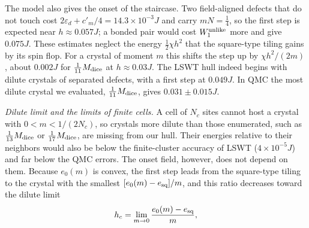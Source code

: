 \documentclass[prb,twocolumn,amsmath,amssymb,floatfix]{revtex4-2}
\newcommand{\Md}{M_{\rm dice}}
\newcommand{\eps}{\varepsilon}
\begin{document}
The model also gives the onset of the staircase. Two field-aligned defects that do not touch cost $2\eps_d+c'_m/4=14.3\times10^{-3}J$ and carry $mN=\frac14$, so the first step is expected near $h\approx0.057J$; a bonded pair would cost $W_1^{\rm unlike}$ more and give $0.075J$. These estimates neglect the energy $\frac12\chi h^2$ that the square-type tiling gains by its spin flop. For a crystal of moment $m$ this shifts the step up by $\chi h^2/(2m)$, about $0.002J$ for $\frac1{11}\Md$ at $h\approx0.03J$. The LSWT hull indeed begins with dilute crystals of separated defects, with a first step at $0.049J$. In QMC the most dilute crystal we evaluated, $\frac1{11}\Md$, gives $0.031\pm0.015J$.

\emph{Dilute limit and the limits of finite cells.} A cell of $N_c$ sites cannot host a crystal with $0<m<1/(2N_c)$, so crystals more dilute than those enumerated, such as $\frac1{13}\Md$ or $\frac1{17}\Md$, are missing from our hull. Their energies relative to their neighbors would also be below the finite-cluster accuracy of LSWT ($4\times10^{-5}J$) and far below the QMC errors. The onset field, however, does not depend on them. Because $e_0(m)$ is convex, the first step leads from the square-type tiling to the crystal with the smallest $[e_0(m)-e_{\rm sq}]/m$, and this ratio decreases toward the dilute limit
\begin{equation}
h_c=\lim_{m\to0}\frac{e_0(m)-e_{\rm sq}}{m},
\label{eq:hc}
\end{equation}
\end{document}
